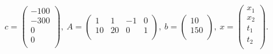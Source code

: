 $$
c = 
\left(
  \begin{array}{c}
    -100 \\
    -300 \\
    0 \\
    0 \\
  \end{array}
\right),~
A = 
\left(
  \begin{array}{cccc}
    1 & 1 & -1 & 0 \\
    10 & 20 & 0 & 1 \\
  \end{array}
\right),~
b =
\left(
  \begin{array}{c}
    10 \\
    150 \\
  \end{array}
\right),~
x =
\left(
  \begin{array}{c}
    x_1 \\
    x_2 \\
    t_1 \\
    t_2 \\
  \end{array}
\right).
$$
